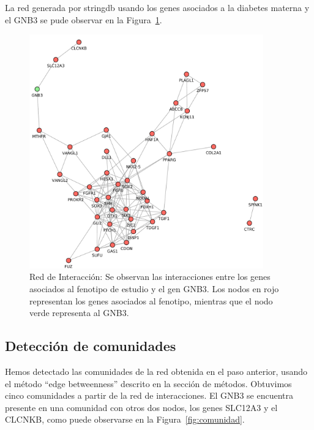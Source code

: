 La red generada por stringdb usando los genes asociados a la diabetes materna y el GNB3 se pude observar en la Figura~\ref{fig:network}.

\begin{figure}[h!]
	\includegraphics[width=0.9\textwidth]{figures/network.pdf}
	\caption{Red de Interacción: Se observan las interacciones entre los genes asociados al fenotipo de estudio y el gen GNB3. Los nodos en rojo representan los genes asociados al fenotipo, mientras que el nodo verde representa al GNB3.}
	\label{fig:network}
\end{figure}

\subsection{Detección de comunidades}

Hemos detectado las comunidades de la red obtenida en el paso anterior, usando el método ``edge betweenness'' descrito en la sección de métodos. Obtuvimos cinco comunidades a partir de la red de interacciones. El GNB3 se encuentra presente en una comunidad con otros dos nodos, los genes SLC12A3 y el CLCNKB, como puede observarse en la Figura~\ref{fig:comunidad}.

